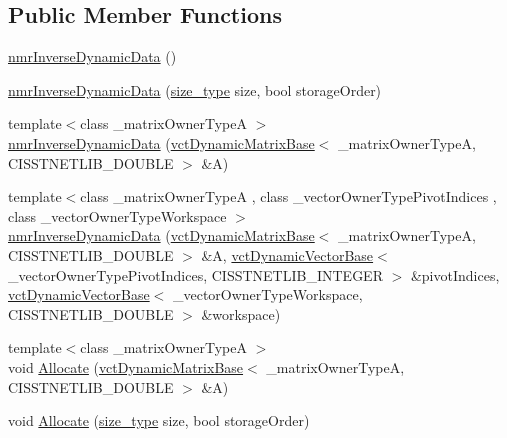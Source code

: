 \subsection*{Public Member Functions}
\begin{DoxyCompactItemize}
\item 
\hyperlink{classnmr_inverse_dynamic_data_a6f3268822254ce8a93f001c4db50ca1c}{nmr\+Inverse\+Dynamic\+Data} ()
\item 
\hyperlink{classnmr_inverse_dynamic_data_a45dde6cb419f11c6c5cec71d38f0c08d}{nmr\+Inverse\+Dynamic\+Data} (\hyperlink{classnmr_inverse_dynamic_data_aeb5c2317adf50d8fc7952a9b38bf0129}{size\+\_\+type} size, bool storage\+Order)
\item 
{\footnotesize template$<$class \+\_\+matrix\+Owner\+Type\+A $>$ }\\\hyperlink{classnmr_inverse_dynamic_data_a0ba22ece629f3a025f4dfd721dfa54f0}{nmr\+Inverse\+Dynamic\+Data} (\hyperlink{classvct_dynamic_matrix_base}{vct\+Dynamic\+Matrix\+Base}$<$ \+\_\+matrix\+Owner\+Type\+A, C\+I\+S\+S\+T\+N\+E\+T\+L\+I\+B\+\_\+\+D\+O\+U\+B\+L\+E $>$ \&A)
\item 
{\footnotesize template$<$class \+\_\+matrix\+Owner\+Type\+A , class \+\_\+vector\+Owner\+Type\+Pivot\+Indices , class \+\_\+vector\+Owner\+Type\+Workspace $>$ }\\\hyperlink{classnmr_inverse_dynamic_data_a6c0cdafd73bb3bad4b7f6113577044c4}{nmr\+Inverse\+Dynamic\+Data} (\hyperlink{classvct_dynamic_matrix_base}{vct\+Dynamic\+Matrix\+Base}$<$ \+\_\+matrix\+Owner\+Type\+A, C\+I\+S\+S\+T\+N\+E\+T\+L\+I\+B\+\_\+\+D\+O\+U\+B\+L\+E $>$ \&A, \hyperlink{classvct_dynamic_vector_base}{vct\+Dynamic\+Vector\+Base}$<$ \+\_\+vector\+Owner\+Type\+Pivot\+Indices, C\+I\+S\+S\+T\+N\+E\+T\+L\+I\+B\+\_\+\+I\+N\+T\+E\+G\+E\+R $>$ \&pivot\+Indices, \hyperlink{classvct_dynamic_vector_base}{vct\+Dynamic\+Vector\+Base}$<$ \+\_\+vector\+Owner\+Type\+Workspace, C\+I\+S\+S\+T\+N\+E\+T\+L\+I\+B\+\_\+\+D\+O\+U\+B\+L\+E $>$ \&workspace)
\item 
{\footnotesize template$<$class \+\_\+matrix\+Owner\+Type\+A $>$ }\\void \hyperlink{classnmr_inverse_dynamic_data_af35278f260546fa717a23a0950e6a4d9}{Allocate} (\hyperlink{classvct_dynamic_matrix_base}{vct\+Dynamic\+Matrix\+Base}$<$ \+\_\+matrix\+Owner\+Type\+A, C\+I\+S\+S\+T\+N\+E\+T\+L\+I\+B\+\_\+\+D\+O\+U\+B\+L\+E $>$ \&A)
\item 
void \hyperlink{classnmr_inverse_dynamic_data_a27ddc2327775aeb06396961e06c92f7d}{Allocate} (\hyperlink{classnmr_inverse_dynamic_data_aeb5c2317adf50d8fc7952a9b38bf0129}{size\+\_\+type} size, bool storage\+Order)

\end{DoxyCompactItemize}
